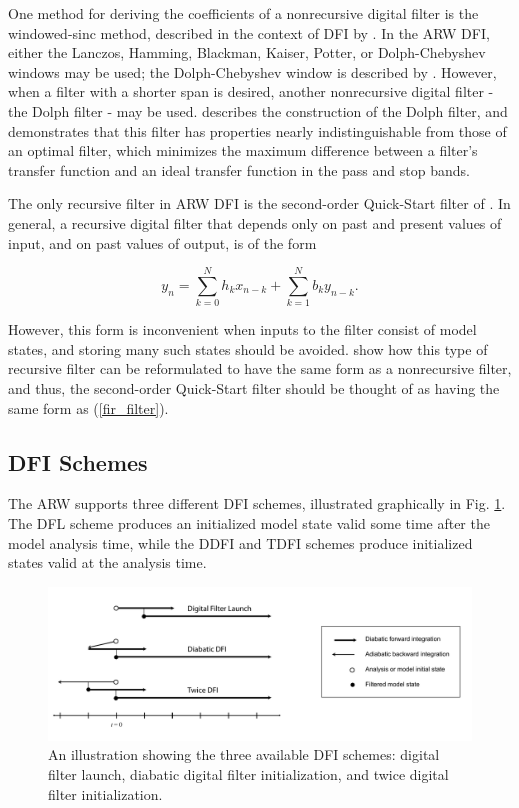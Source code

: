 One method for deriving the coefficients of a nonrecursive digital filter is 
the windowed-sinc method, described in the context of DFI by \cite{lynchhuang92}. 
In the ARW DFI, either the Lanczos, Hamming, Blackman, Kaiser, Potter, or 
Dolph-Chebyshev windows may be used; the Dolph-Chebyshev window is described 
by \cite{lynch97}. However, when a filter with a shorter span is desired, 
another nonrecursive digital filter - the Dolph filter - may be used. \cite{lynch97} 
describes the construction of the Dolph filter, and demonstrates that this 
filter has properties nearly indistinguishable from those of an optimal filter, 
which minimizes the maximum difference between a filter's transfer function 
and an ideal transfer function in the pass and stop bands. 

The only recursive filter in ARW DFI is the second-order Quick-Start 
filter of \cite{lynchhuang94}. In general, a recursive digital filter that 
depends only on past and present values of input, and on past values of 
output, is of the form

\begin{equation}
y_n = \sum_{k=0}^{N} h_k x_{n-k} + \sum_{k=1}^{N} b_k y_{n-k}.
\end{equation}

\noindent
However, this form is inconvenient when inputs to the filter consist of 
model states, and storing many such states should be avoided. \cite{lynchhuang94} 
show how this type of recursive filter can be reformulated to have the same 
form as a nonrecursive filter, and thus, the second-order 
Quick-Start filter should be thought of as having the same form as (\ref{fir_filter}).

\subsection{DFI Schemes}

The ARW supports three different DFI schemes, illustrated graphically in 
Fig. \ref{figure:dfi_types}. The DFL scheme produces an initialized model 
state valid some time after the model analysis time, while the DDFI and TDFI 
schemes produce initialized states valid at the analysis time.

%
%
\begin{figure}
  \centering
  \includegraphics[width=6.5in]{figures/dfi_schemes.pdf}
  \caption{\label{figure:dfi_types}An illustration showing the three available DFI schemes: digital filter 
  launch, diabatic digital filter initialization, and twice digital filter initialization.}
\end{figure}

